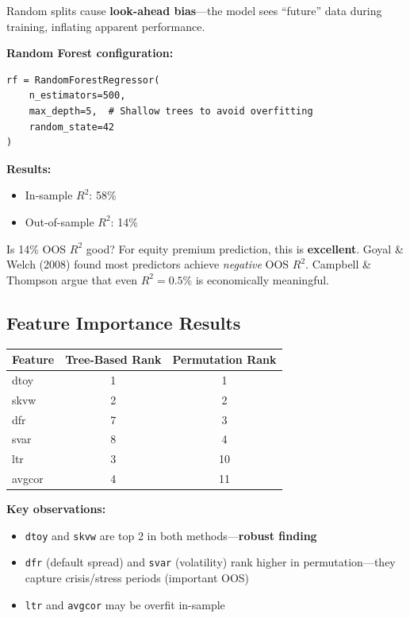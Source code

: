 \documentclass[11pt,a4paper]{article}
\newcommand{\keyword}[1]{\textbf{\textcolor{AccentOrange}{#1}}}
\begin{document}
Random splits cause \keyword{look-ahead bias}---the model sees ``future'' data during training, inflating apparent performance.

\textbf{Random Forest configuration:}
\begin{verbatim}
rf = RandomForestRegressor(
    n_estimators=500,
    max_depth=5,  # Shallow trees to avoid overfitting
    random_state=42
)
\end{verbatim}

\textbf{Results:}
\begin{itemize}
    \item In-sample $R^2$: 58\%
    \item Out-of-sample $R^2$: 14\%
\end{itemize}

Is 14\% OOS $R^2$ good? For equity premium prediction, this is \keyword{excellent}. Goyal \& Welch (2008) found most predictors achieve \emph{negative} OOS $R^2$. Campbell \& Thompson argue that even $R^2 = 0.5\%$ is economically meaningful.

\subsection{Feature Importance Results}

\begin{center}
\begin{tabular}{lcc}
    \toprule
    \textbf{Feature} & \textbf{Tree-Based Rank} & \textbf{Permutation Rank} \\
    \midrule
    dtoy & 1 & 1 \\
    skvw & 2 & 2 \\
    dfr & 7 & 3 \\
    svar & 8 & 4 \\
    ltr & 3 & 10 \\
    avgcor & 4 & 11 \\
    \bottomrule
\end{tabular}
\end{center}

\textbf{Key observations:}
\begin{itemize}
    \item \texttt{dtoy} and \texttt{skvw} are top 2 in both methods---\keyword{robust finding}
    \item \texttt{dfr} (default spread) and \texttt{svar} (volatility) rank higher in permutation---they capture crisis/stress periods (important OOS)
    \item \texttt{ltr} and \texttt{avgcor} may be overfit in-sample
\end{itemize}
\end{document}
